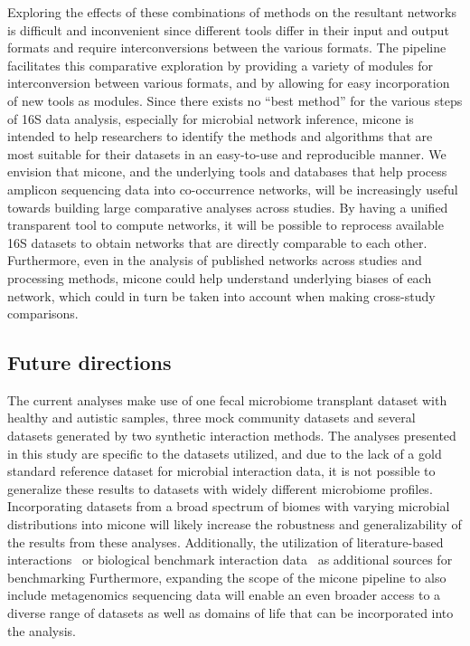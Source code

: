   Exploring the effects of these combinations of methods on the resultant networks is difficult and inconvenient since different tools differ in their input and output formats and require interconversions between the various formats.
  The pipeline facilitates this comparative exploration by providing a variety of modules for interconversion between various formats, and by allowing for easy incorporation of new tools as modules.
  Since there exists no ``best method'' for the various steps of 16S data analysis, especially for microbial network inference, \ac{micone} is intended to help researchers to identify the methods and algorithms that are most suitable for their datasets in an easy-to-use and reproducible manner.
  We envision that \ac{micone}, and the underlying tools and databases that help process amplicon sequencing data into co-occurrence networks, will be increasingly useful towards building large comparative analyses across studies.
  By having a unified transparent tool to compute networks, it will be possible to reprocess available 16S datasets to obtain networks that are directly comparable to each other.
  Furthermore, even in the analysis of published networks across studies and processing methods, \ac{micone} could help understand underlying biases of each network, which could in turn be taken into account when making cross-study comparisons.

  \subsection*{Future directions}

  The current analyses make use of one fecal microbiome transplant dataset with healthy and autistic samples, three mock community datasets and several datasets generated by two synthetic interaction methods.
  The analyses presented in this study are specific to the datasets utilized, and due to the lack of a gold standard reference dataset for microbial interaction data, it is not possible to generalize these results to datasets with widely different microbiome profiles.
  Incorporating datasets from a broad spectrum of biomes with varying microbial distributions into \ac{micone} will likely increase the robustness and generalizability of the results from these analyses.
  Additionally, the utilization of literature-based interactions~\cite{lima-mendezDeterminantsCommunityStructure2015a} or biological benchmark interaction data~\cite{sungGlobalMetabolicInteraction2017a} as additional sources for benchmarking
  Furthermore, expanding the scope of the \ac{micone} pipeline to also include metagenomics sequencing data will enable an even broader access to a diverse range of datasets as well as domains of life that can be incorporated into the analysis.


